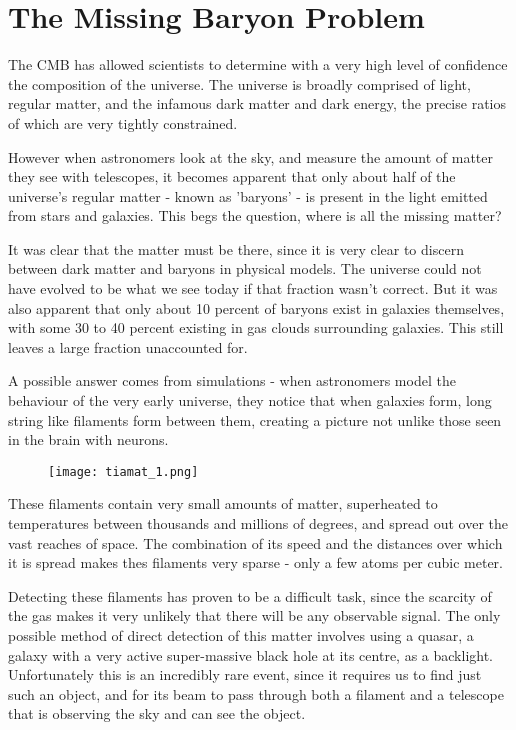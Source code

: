 \documentclass{nature}
\begin{document}
\section{The Missing Baryon Problem}
The CMB has allowed scientists to determine with a very high level of confidence the composition of the universe. The universe is broadly comprised of light, regular matter, and the infamous dark matter and dark energy, the precise ratios of which are very tightly constrained. 

However when astronomers look at the sky, and measure the amount of matter they see with telescopes, it becomes apparent that only about half of the universe's regular matter - known as 'baryons' - is present in the light emitted from stars and galaxies. This begs the question, where is all the missing matter? 

It was clear that the matter must be there, since it is very clear to discern between dark matter and baryons in physical models. The universe could not have evolved to be what we see today if that fraction wasn't correct. But it was also apparent that only about 10 percent of baryons exist in galaxies themselves, with some 30 to 40 percent existing in gas clouds surrounding galaxies. This still leaves a large fraction unaccounted for. 

A possible answer comes from simulations - when astronomers model the behaviour of the very early universe, they notice that when galaxies form, long string like filaments form between them, creating a picture not unlike those seen in the brain with neurons.

\begin{figure}[h]
    \texttt{[image: tiamat\_1.png]}
\end{figure}


These filaments contain very small amounts of matter, superheated to temperatures between thousands and millions of degrees, and spread out over the vast reaches of space. The combination of its speed and the distances over which it is spread makes thes filaments very sparse - only a few atoms per cubic meter. 

Detecting these filaments has proven to be a difficult task, since the scarcity of the gas makes it very unlikely that there will be any observable signal. The only possible method of direct detection of this matter involves using a quasar, a galaxy with a very active super-massive black hole at its centre, as a backlight. Unfortunately this is an incredibly rare event, since it requires us to find just such an object, and for its beam to pass through both a filament and a telescope that is observing the sky and can see the object. 
\end{document}
